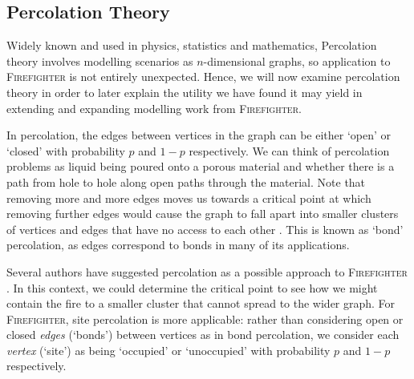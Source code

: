 \documentclass[../report.tex]{subfiles}
\begin{document}


\subsection{Percolation Theory}
\label{sec:perc}

Widely known and used in physics, statistics and mathematics, Percolation theory involves modelling scenarios as $n$-dimensional graphs, so application to {\scshape Firefighter} is not entirely unexpected. Hence, we will now examine percolation theory in order to later explain the utility we have found it may yield in extending and expanding modelling work from {\scshape Firefighter}.

In percolation, the edges between vertices in the graph can be either `open' or `closed' with probability $p$ and $1-p$ respectively. We can think of percolation problems as liquid being poured onto a porous material and whether there is a path from hole to hole along open paths through the material. Note that removing more and more edges moves us towards a critical point at which removing further edges would cause the graph to fall apart into smaller clusters of vertices and edges that have no access to each other \cite{grimmett_1999}. This is known as `bond' percolation, as edges correspond to bonds in many of its applications.

Several authors have suggested percolation as a possible approach to {\scshape Firefighter} \cite{finbow_2009}. In this context, we could determine the critical point to see how we might contain the fire to a smaller cluster that cannot spread to the wider graph. For {\scshape Firefighter}, site percolation is more applicable: rather than considering open or closed \emph{edges} (`bonds') between vertices as in bond percolation, we consider each \emph{vertex} (`site') as being `occupied' or `unoccupied' with probability $p$ and $1-p$ respectively.
\end{document}
